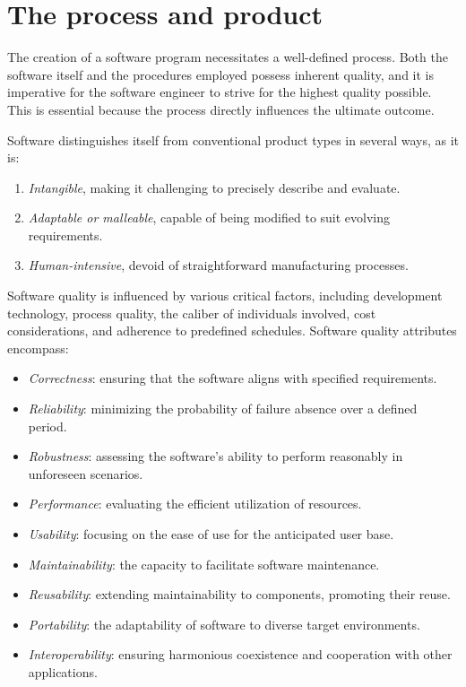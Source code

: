 \section{The process and product}

The creation of a software program necessitates a well-defined process. 
Both the software itself and the procedures employed possess inherent quality, and it is imperative for the software engineer to strive for the highest quality possible. 
This is essential because the process directly influences the ultimate outcome.

Software distinguishes itself from conventional product types in several ways, as it is:
\begin{enumerate}
    \item \textit{Intangible}, making it challenging to precisely describe and evaluate.
    \item \textit{Adaptable or malleable}, capable of being modified to suit evolving requirements.
    \item \textit{Human-intensive}, devoid of straightforward manufacturing processes.
\end{enumerate}
Software quality is influenced by various critical factors, including development technology, process quality, the caliber of individuals involved, cost considerations, and adherence to predefined schedules. 
Software quality attributes encompass:
\begin{itemize}
    \item \textit{Correctness}: ensuring that the software aligns with specified requirements.
    \item \textit{Reliability}: minimizing the probability of failure absence over a defined period.
    \item \textit{Robustness}: assessing the software's ability to perform reasonably in unforeseen scenarios.
    \item \textit{Performance}: evaluating the efficient utilization of resources.
    \item \textit{Usability}: focusing on the ease of use for the anticipated user base.
    \item \textit{Maintainability}: the capacity to facilitate software maintenance.
    \item \textit{Reusability}: extending maintainability to components, promoting their reuse.
    \item \textit{Portability}: the adaptability of software to diverse target environments.
    \item \textit{Interoperability}: ensuring harmonious coexistence and cooperation with other applications.
\end{itemize}

